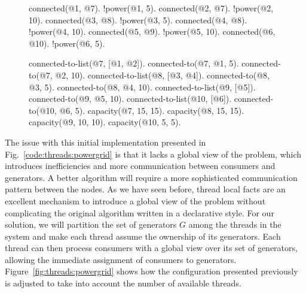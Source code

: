 \begin{figure}[h!]
\begin{LineCode}[commandchars=*\#\&]
connected(@1, @7).    !power(@1, 5).
connected(@2, @7).    !power(@2, 10).
connected(@3, @8).    !power(@3, 5).
connected(@4, @8).    !power(@4, 10).
connected(@5, @9).    !power(@5, 10).
connected(@6, @10).   !power(@6, 5).

connected-to-list(@7, [@1, @2]).   connected-to(@7, @1, 5).   connected-to(@7, @2, 10).
connected-to-list(@8, [@3, @4]).   connected-to(@8, @3, 5).   connected-to(@8, @4, 10).
connected-to-list(@9, [@5]).       connected-to(@9, @5, 10).
connected-to-list(@10, [@6]).      connected-to(@10, @6, 5).
capacity(@7, 15, 15).
capacity(@8, 15, 15).
capacity(@9, 10, 10).
capacity(@10, 5, 5).
\end{LineCode}
\label{code:threads:powergrid_final}
\end{figure}

The issue with this initial implementation presented in
Fig.~\ref{code:threads:powergrid} is that it lacks a global view of the problem,
which introduces inefficiencies and more communication between consumers and
generators. A better algorithm will require a more sophisticated communication
pattern between the nodes. As we have seen before, thread local facts are an
excellent mechanism to introduce a global view of the problem without
complicating the original algorithm written in a declarative style. For our
solution, we will partition the set of generators $G$ among the threads in the
system and make each thread assume the ownership of its generators. Each thread
can then process consumers with a global view over its set of generators,
allowing the immediate assignment of consumers to generators.
Figure~\ref{fig:threads:powergrid} shows how the configuration presented
previously is adjusted to take into account the number of available threads.

